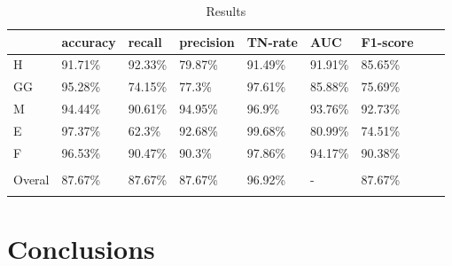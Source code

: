 \documentclass[conference]{IEEEtran}
\begin{document}
\begin{table}[tbh]
\caption{Results}
\label{cm:result}
\small
\centering
\begin{tabular}{@{}lllllllll@{}}
\toprule
&accuracy&recall  &precision & TN-rate &   AUC   &  F1-score \\ \midrule

H & 91.71\% & 92.33\% & 79.87\% & 91.49\% & 91.91\% & 85.65\% \\ 
GG & 95.28\% & 74.15\% & 77.3\% & 97.61\% & 85.88\% & 75.69\% \\ 
M & 94.44\% & 90.61\% & 94.95\% & 96.9\% & 93.76\% & 92.73\% \\ 
E & 97.37\% & 62.3\% & 92.68\% & 99.68\% & 80.99\% & 74.51\% \\ 
F & 96.53\% & 90.47\% & 90.3\% & 97.86\% & 94.17\% & 90.38\% \\   \bottomrule
\vspace{-0.25cm} \\ 
Overal & 87.67\% & 87.67\% & 87.67\% & 96.92\% & - & 87.67\% \\ 
\vspace{-0.3cm} \\ 
\bottomrule

\end{tabular}
\end{table}







\vspace{1cm}
\section{Conclusions}
\vspace{1cm}











\vspace{12pt}
\end{document}
